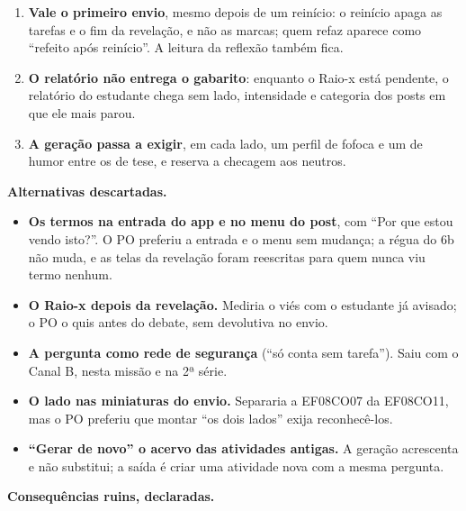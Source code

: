 \begin{enumerate}
    reflexão.
  \item \textbf{Vale o primeiro envio}, mesmo depois de um reinício: o reinício
    apaga as tarefas e o fim da revelação, e não as marcas; quem refaz aparece
    como \enquote{refeito após reinício}. A leitura da reflexão também fica.
  \item \textbf{O relatório não entrega o gabarito}: enquanto o Raio-x está
    pendente, o relatório do estudante chega sem lado, intensidade e
    categoria dos posts em que ele mais parou.
  \item \textbf{A geração passa a exigir}, em cada lado, um perfil de fofoca e
    um de humor entre os de tese, e reserva a checagem aos neutros.
\end{enumerate}

\textbf{Alternativas descartadas.}

\begin{itemize}
  \item \textbf{Os termos na entrada do app e no menu do post}, com
    \enquote{Por que estou vendo isto?}. O PO preferiu a entrada e o menu sem
    mudança; a régua do 6b não muda, e as telas da revelação foram reescritas
    para quem nunca viu termo nenhum.
  \item \textbf{O Raio-x depois da revelação.} Mediria o viés com o estudante
    já avisado; o PO o quis antes do debate, sem devolutiva no envio.
  \item \textbf{A pergunta como rede de segurança} (\enquote{só conta sem
    tarefa}). Saiu com o Canal B, nesta missão e na 2ª série.
  \item \textbf{O lado nas miniaturas do envio.} Separaria a EF08CO07 da
    EF08CO11, mas o PO preferiu que montar \enquote{os dois lados} exija
    reconhecê-los.
  \item \textbf{\enquote{Gerar de novo} o acervo das atividades antigas.} A
    geração acrescenta e não substitui; a saída é criar uma atividade nova com
    a mesma pergunta.
\end{itemize}

\textbf{Consequências ruins, declaradas.}

